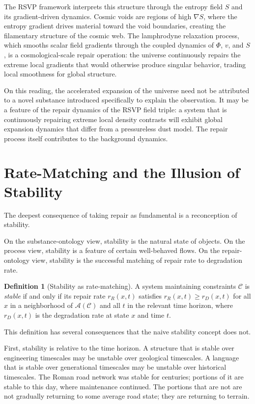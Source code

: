 \documentclass[11pt, a4paper]{article}
\theoremstyle{definition}
\newtheorem{definition}{Definition}
\theoremstyle{remark}
\begin{document}
The RSVP framework interprets this structure through the entropy field $S$ and
its gradient-driven dynamics. Cosmic voids are regions of high $\nabla S$, where
the entropy gradient drives material toward the void boundaries, creating the
filamentary structure of the cosmic web. The lamphrodyne relaxation process,
which smooths scalar field gradients through the coupled dynamics of $\Phi$,
$v$, and $S$, is a cosmological-scale repair operation: the universe continuously
repairs the extreme local gradients that would otherwise produce singular
behavior, trading local smoothness for global structure.

On this reading, the accelerated expansion of the universe need not be attributed
to a novel substance introduced specifically to explain the observation. It may
be a feature of the repair dynamics of the RSVP field triple: a system that
is continuously repairing extreme local density contrasts will exhibit global
expansion dynamics that differ from a pressureless dust model. The repair
process itself contributes to the background dynamics.

\section{Rate-Matching and the Illusion of Stability}

The deepest consequence of taking repair as fundamental is a reconception of
stability.

On the substance-ontology view, stability is the natural state of objects.
On the process view, stability is a feature of certain well-behaved flows. On
the repair-ontology view, stability is the successful matching of repair rate
to degradation rate.

\begin{definition}[Stability as rate-matching]
A system maintaining constraints $\mathcal{C}$ is \textit{stable} if and
only if its repair rate $r_R(x, t)$ satisfies $r_R(x, t) \geq r_D(x, t)$
for all $x$ in a neighborhood of $\mathcal{A}(\mathcal{C})$ and all $t$
in the relevant time horizon, where $r_D(x, t)$ is the degradation rate
at state $x$ and time $t$.
\end{definition}

This definition has several consequences that the naive stability concept does
not.

First, stability is relative to the time horizon. A structure that is stable
over engineering timescales may be unstable over geological timescales. A
language that is stable over generational timescales may be unstable over
historical timescales. The Roman road network was stable for centuries; portions
of it are stable to this day, where maintenance continued. The portions that are
not are not gradually returning to some average road state; they are returning
to terrain.
\end{document}
